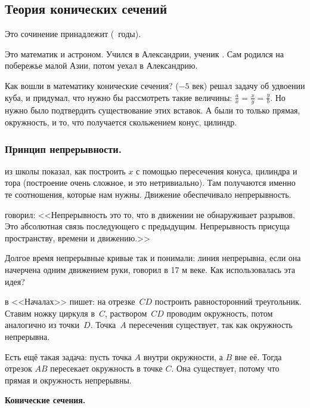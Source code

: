 \documentclass[a4paper,oneside,fleqn,10pt]{article}
\begin{document}

\subsection{Теория конических сечений}

\label{sec:conicae}

Это сочинение принадлежит  (~годы).

Это математик и астроном. Учился в Александрии, ученик
. Сам родился на побережье малой Азии, потом
уехал в Александрию.

Как вошли в математику конические сечения? 
($-5$ век) решал задачу об удвоении куба, и придумал, что нужно бы
рассмотреть такие величины: $\frac ax = \frac xy = \frac yb$. Но нужно
было подтвердить существование этих вставок.  А были то только прямая,
окружность, и то, что получается скольжением конус, цилиндр.

\subsubsection{Принцип непрерывности.}

 из школы  показал, как построить
$x$ с помощью пересечения конуса, цилиндра и тора (построение очень
сложное, и это нетривиально).  Там получаются именно те соотношения,
которые нам нужны.  Движение обеспечивало непрерывность.

 говорил: <<Непрерывность это то, что в движении не
обнаруживает разрывов.  Это абсолютная связь последующего с
предыдущим. Непрерывность присуща пространству, времени и движению.>>

Долгое время непрерывные кривые так и понимали: линия непрерывна, если
она начерчена одним движением руки, говорил  в 17 м веке.
Как использовалась эта идея?

 в <<Началах>> пишет: на отрезке~$CD$ построить
равносторонний треугольник.  Ставим ножку циркуля в~$C$,
раствором~$CD$ проводим окружность, потом аналогично из
точки~$D$. Точка~$A$ пересечения существует, так как окружность
непрерывна.

Есть ещё такая задача: пусть точка $A$ внутри окружности, а $B$ вне
её. Тогда отрезок $AB$ пересекает окружность в точке $C$. Она
существует, потому что прямая и окружность непрерывны.

\textbf{Конические сечения.}
\end{document}
